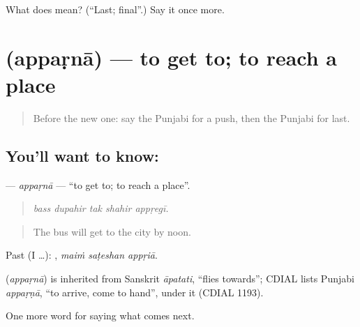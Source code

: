 \begin{tcolorbox}[breakable,colback=teal!4,colframe=teal!35!black,title={Before you move on}]
What does  mean? (\textquotedblleft{}Last; final\textquotedblright{}.) Say it once more.
\end{tcolorbox}
\section[\texorpdfstring{\pa{ਅੱਪੜਨਾ} (appaṛnā)}{ਅੱਪੜਨਾ (appaṛnā)}]{ (appaṛnā) — to get to; to reach a place}

\label{lesson:PA-C284-apparna}



\begin{quote}
Before the new one: say the Punjabi for a push, then the Punjabi for last.
\end{quote}

\subsection*{You'll want to know: }
\textbf{} — \emph{appaṛnā} — \textquotedblleft{}to get to; to reach a place\textquotedblright{}.

\begin{quote}
    
\end{quote}

\begin{quote}
\emph{bass dupahir tak shahir appṛegī.}
\end{quote}

\begin{quote}
The bus will get to the city by noon.
\end{quote}

Past (I …):   , \emph{maiṁ saṭeshan appṛiā}.

\begin{cousinweb}
\textbf{} (\emph{appaṛnā}) is inherited from Sanskrit \emph{āpatati}, \textquotedblleft{}flies towards\textquotedblright{}; CDIAL lists Punjabi \emph{appaṛṇā}, \textquotedblleft{}to arrive, come to hand\textquotedblright{}, under it (CDIAL 1193).
\end{cousinweb}

\begin{grammarlens}[title={What you've built}]
One more word for saying what comes next.
\end{grammarlens}

